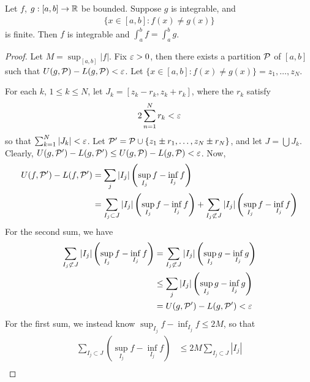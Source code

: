 \documentclass{../../template/note}
\begin{document}
    \begin{lemma}
        \label{finite-diff-integrable}
        Let \(f\), \(g: [a, b] \to \mathbb R\) be bounded. Suppose \(g\) is integrable, and 
        \begin{align*}
            \{x \in [a, b]: f(x) \neq g(x)\}
        \end{align*}
        is finite. Then \(f\) is integrable and \(\int_a^b f = \int_a^b g\).
    \end{lemma}
    
    \begin{proof}
        Let \(M = \sup_{[a, b]} |f|\). Fix \(\varepsilon > 0\), then there exists a partition \(\mathcal{P}\) of \([a, b]\) such that \(U(g, \mathcal{P}) - L(g, \mathcal{P}) < \varepsilon\). Let \(\{x \in [a, b]: f(x) \neq g(x)\} = {z_1, \dots, z_N}\).

        For each \(k\), \(1 \leq k \leq N\), let \(J_k = [z_k-r_k, z_k+r_k]\), where the \(r_k\) satisfy
        \begin{align*}
            2\sum_{n=1}^N r_k < \varepsilon
        \end{align*}
        so that \(\sum_{k=1}^N |J_k| < \varepsilon\). Let \(\mathcal{P}' = \mathcal{P} \cup \{z_1 \pm r_1, \dots, z_N \pm r_N\}\), and let \(J = \bigcup J_k\). Clearly, \(U(g, \mathcal{P}') - L(g, \mathcal{P}') \leq U(g, \mathcal{P}) - L(g, \mathcal{P}) < \varepsilon\). Now,
        \begin{align*}
            U(f, \mathcal{P}') - L(f, \mathcal{P}') &= \sum_{j} |I_j| \left(\sup_{I_j} f - \inf_{I_j} f\right) \\
            &= \sum_{I_j \subset J} |I_j| \left(\sup_{I_j} f - \inf_{I_j} f\right) + \sum_{I_j \not\subset J} |I_j| \left(\sup_{I_j} f - \inf_{I_j} f\right)
        \end{align*}
        For the second sum, we have
        \begin{align*}
            \sum_{I_j \not\subset J} |I_j| \left(\sup_{I_j} f - \inf_{I_j} f\right) &= \sum_{I_j \not\subset J} |I_j| \left(\sup_{I_j} g - \inf_{I_j} g\right) \\
            &\leq \sum_j |I_j| \left(\sup_{I_j} g - \inf_{I_j} g\right) \\
            &= U(g, \mathcal{P}') - L(g, \mathcal{P}') < \varepsilon
        \end{align*}
        For the first sum, we instead know \(\sup_{I_j} f - \inf_{I_j} f \leq 2M\), so that
        \begin{align*}
            \sum_{I_j \subset J} \left(\sup_{I_j} f - \inf_{I_j} f\right) &\leq 2M \sum_{I_j \subset J} |I_j| \\

\end{align*}
\end{proof}
\end{document}

